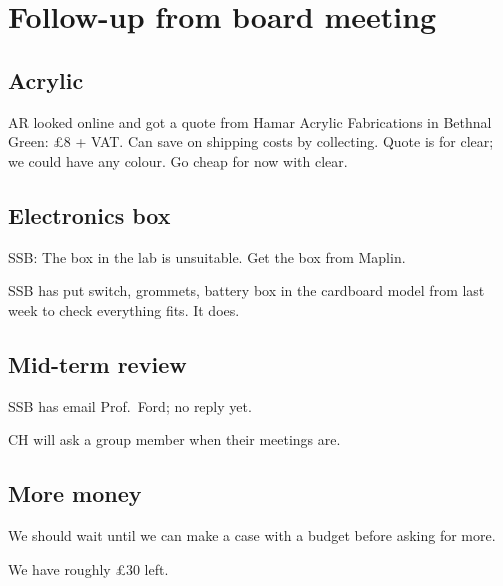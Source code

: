 \documentclass[a4paper,11pt,twoside,class=meetingmins,crop=false]{standalone}
\begin{document}

\maketitle

\section{Follow-up from board meeting}
    \begin{items}
    \subsection{Acrylic}
        \item AR looked online and got a quote from Hamar Acrylic Fabrications in Bethnal Green:  \pounds{8} + VAT. Can save on shipping costs by collecting. Quote is for clear; we could have any colour.
        \decisions Go cheap for now with clear.

    \subsection{Electronics box}
        \item SSB: The box in the lab is unsuitable.
        \decisions Get the box from Maplin.
        \item SSB has put switch, grommets, battery box in the cardboard model from last week to check everything fits. It does.

    \subsection{Mid-term review}
        \item SSB has email Prof.~Ford; no reply yet.
        \item CH will ask a group member when their meetings are.

    \subsection{More money}
        \item We should wait until we can make a case with a budget before asking for more.
        \item We have roughly \pounds{30} left.


\end{items}
\end{document}
